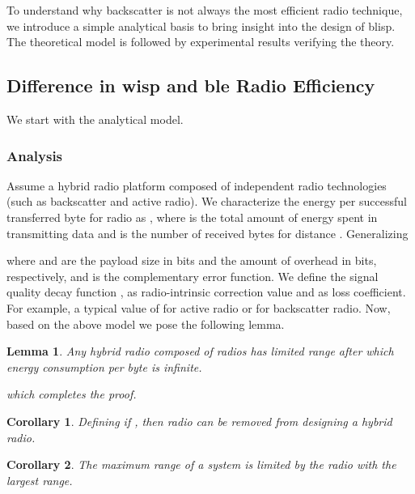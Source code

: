\documentclass[conference,letterpaper,twoside,final,10pt]{IEEEtran}
\newtheorem{lemma}{Lemma}
\newtheorem{corollary}{Corollary}
\begin{document}
To understand why backscatter is not always the most efficient radio technique, we introduce a simple analytical basis to bring insight into the design of \ac{blisp}. The theoretical model is followed by experimental results verifying the theory.

\subsection{Difference in \acs{wisp} and \acs{ble} Radio Efficiency}
\label{sec:motivation/efficiency}

We start with the analytical model.

\subsubsection{Analysis}
\label{sec:motivation/evaluation}

Assume a hybrid radio platform composed of  independent radio technologies (such as backscatter and active radio). We characterize the energy per successful transferred byte for radio  as , where  is the total amount of energy spent in transmitting data and  is the number of received bytes for distance . Generalizing~\cite[Sec. III-A]{lettieri1998info}

where  and  are the payload size in bits and the amount of overhead in bits, respectively, and  is the complementary error function.
We define the signal quality decay function ,  as radio-intrinsic correction value and  as loss coefficient. For example, a typical value of  for active radio or  for backscatter radio. Now, based on the above model we pose the following lemma.
\begin{lemma}
	\label{lemma:gotoinfinity}
	Any hybrid radio composed of  radios has limited range after which energy consumption per byte is infinite.
	\begin{IEEEproof}  which completes the proof.
	\end{IEEEproof}
\end{lemma}

\begin{corollary}
	\label{lemma:excludehigh}
	Defining  if , then radio  can be removed from designing a hybrid radio.
\end{corollary}

\begin{corollary}
	\label{lemma:maxrange}
	The maximum range of a system is limited by the radio with the largest range.
\end{corollary}
\end{document}
